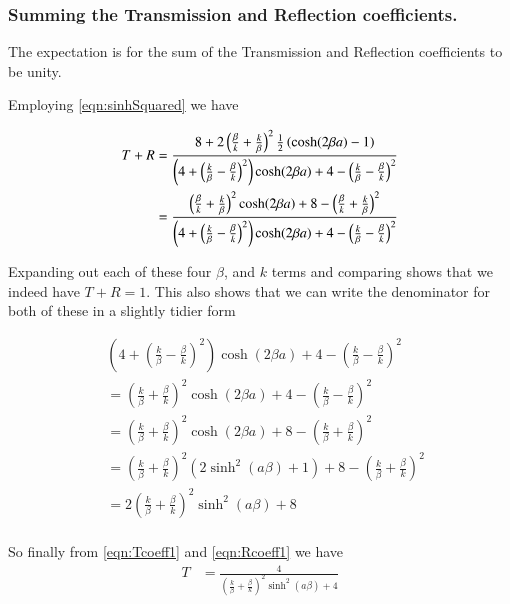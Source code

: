 \documentclass{article}
\begin{document}
\subsubsection{ Summing the Transmission and Reflection coefficients. }

The expectation is for the 
sum of the Transmission and Reflection coefficients to be unity.

Employing \ref{eqn:sinhSquared} we have

\begin{align*}
T + R 
&= \frac{8 + 2 
\left(\frac{\beta}{k} + \frac{k}{\beta} \right)^2 
\frac{1}{2} \left( \cosh(2 \beta a) -1 \right) 
} { 
\left(4 + \left( \frac{k}{\beta} -\frac{\beta}{k} \right)^2 \right)
\cosh(2\beta a)
+ 
4 - \left(\frac{k}{\beta} - \frac{\beta}{k} \right)^2 
} \\
&= \frac{ 
\left(\frac{\beta}{k} + \frac{k}{\beta} \right)^2 
\cosh(2 \beta a) + 8 - \left(\frac{\beta}{k} + \frac{k}{\beta} \right)^2 
} { 
\left(4 + \left( \frac{k}{\beta} -\frac{\beta}{k} \right)^2 \right)
\cosh(2\beta a)
+ 
4 - \left(\frac{k}{\beta} - \frac{\beta}{k} \right)^2 
} \\
\end{align*}

Expanding out each of these four $\beta$, and $k$ terms and comparing shows that
we indeed have $T + R = 1$.  This also shows that we can write the denominator for both of
these 
in a 
slightly tidier form

\begin{align*}
&\left(4 + \left( \frac{k}{\beta} -\frac{\beta}{k} \right)^2 \right)
\cosh(2\beta a)
+ 
4 - \left(\frac{k}{\beta} - \frac{\beta}{k} \right)^2  \\
&=
\left( \frac{k}{\beta} +\frac{\beta}{k} \right)^2 
\cosh(2\beta a)
+ 
4 - \left(\frac{k}{\beta} - \frac{\beta}{k} \right)^2  \\
&=
\left( \frac{k}{\beta} +\frac{\beta}{k} \right)^2 
\cosh(2\beta a)
+ 
8 - \left(\frac{k}{\beta} + \frac{\beta}{k} \right)^2  \\
&=
\left( \frac{k}{\beta} +\frac{\beta}{k} \right)^2 
\left( 2 \sinh^2(a \beta) + 1\right)
+ 
8 - \left(\frac{k}{\beta} + \frac{\beta}{k} \right)^2  \\
&=
2 \left( \frac{k}{\beta} +\frac{\beta}{k} \right)^2 
\sinh^2(a \beta) + 8 \\
\end{align*}

So finally from \ref{eqn:Tcoeff1} and \ref{eqn:Rcoeff1} we have
\begin{align}
T 
&= \frac{4} { 
\left( \frac{k}{\beta} +\frac{\beta}{k} \right)^2 
\sinh^2(a \beta) + 4
}
\end{align}
\end{document}
